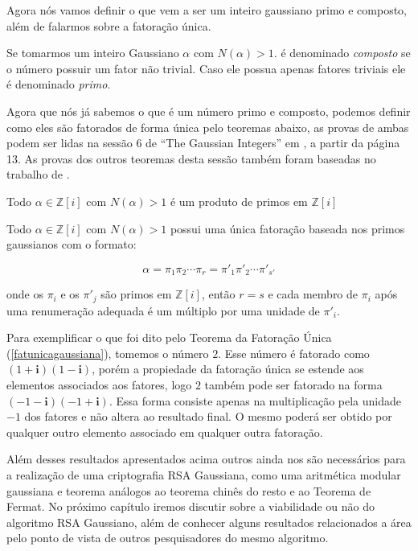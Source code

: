 Agora n\'os vamos definir o que vem a ser um inteiro gaussiano primo e composto, al\'em de falarmos sobre a fatora\c{c}\~ao \'unica.

\begin{Df}
Se tomarmos um inteiro Gaussiano $\alpha$ com $N(\alpha) > 1$. \'e denominado \textit{composto} se o n\'umero possuir um fator n\~ao trivial. Caso ele possua apenas fatores triviais ele \'e denominado \textit{primo}.
\end{Df}

Agora que n\'os j\'a sabemos o que \'e um n\'umero primo e composto, podemos definir como eles s\~ao fatorados de forma \'unica pelo teoremas abaixo, as provas de ambas podem ser lidas na sess\~ao 6 de ``The Gaussian Integers'' em \cite{conrad}, a partir da p\'agina 13. As provas dos outros teoremas desta sess\~ao tamb\'em foram baseadas no trabalho de \cite{conrad}.

\begin{Th}
 Todo $\alpha \in \mathbb{Z}[i]$ com $N(\alpha) > 1$ \'e um produto de primos em $\mathbb{Z}[i]$
\end{Th}

\begin{Th} \label{fatunicagaussiana}
 Todo $\alpha \in \mathbb{Z}[i]$ com $N(\alpha) > 1$ possui uma \'unica fatora\c{c}\~ao baseada nos primos gaussianos com o formato:

	$$\alpha = \pi_1 \pi_2 \cdots \pi_{r} = \pi'_1 \pi'_2 \cdots \pi'_{s'} $$

onde os $\pi_i$ e os $\pi'_j$ s\~ao primos em $\mathbb{Z}[i]$, ent\~ao $r=s$ e cada membro de $\pi_i$ ap\'os uma renumera\c{c}\~ao adequada \'e um m\'ultiplo por uma unidade de $\pi'_i$.

\end{Th}

Para exemplificar o que foi dito pelo Teorema da Fatora\c{c}\~ao \'Unica (\ref{fatunicagaussiana}), tomemos o n\'umero $2$. Esse n\'umero \'e fatorado como $(1 + \textbf{i})(1 - \textbf{i})$, por\'em a propiedade da fatora\c{c}\~ao \'unica se estende aos elementos associados aos fatores, logo $2$ tamb\'em pode ser fatorado na forma $(-1 - \textbf{i})(-1 + \textbf{i})$. Essa forma consiste apenas na multiplica\c{c}\~ao pela unidade $-1$ dos fatores e n\~ao altera ao resultado final. O mesmo poder\'a ser obtido por qualquer outro elemento associado em qualquer outra fatora\c{c}\~ao.

Al\'em desses resultados apresentados acima outros ainda nos s\~ao necess\'arios para a realiza\c{c}\~ao de uma criptografia RSA Gaussiana, como uma aritm\'etica modular gaussiana e teorema an\'alogos ao teorema chin\^es do resto e ao Teorema de Fermat. No pr\'oximo cap\'itulo iremos discutir sobre a viabilidade ou n\~ao do algoritmo RSA Gaussiano, al\'em de conhecer alguns resultados relacionados a \'area pelo ponto de vista de outros pesquisadores do mesmo algoritmo.